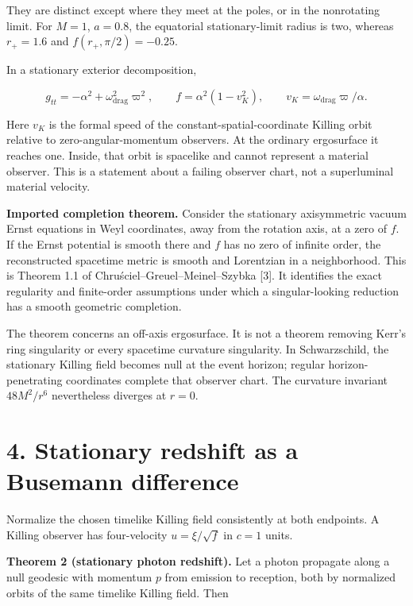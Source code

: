 \documentclass[
  11pt,
  a4paper,
]{article}
\begin{document}
They are distinct except where they meet at the poles, or in the nonrotating limit. For \(M=1\), \(a=0.8\), the equatorial stationary-limit radius is two, whereas \(r_+=1.6\) and \(f(r_+,\pi/2)=-0.25\).

In a stationary exterior decomposition,

\[
g_{tt}=-\alpha^2+\omega_{\mathrm{drag}}^2\varpi^2,
\qquad f=\alpha^2(1-v_K^2),
\qquad v_K=\omega_{\mathrm{drag}}\varpi/\alpha.
\]

Here \(v_K\) is the formal speed of the constant-spatial-coordinate Killing orbit relative to zero-angular-momentum observers. At the ordinary ergosurface it reaches one. Inside, that orbit is spacelike and cannot represent a material observer. This is a statement about a failing observer chart, not a superluminal material velocity.

\textbf{Imported completion theorem.} Consider the stationary axisymmetric vacuum Ernst equations in Weyl coordinates, away from the rotation axis, at a zero of \(f\). If the Ernst potential is smooth there and \(f\) has no zero of infinite order, the reconstructed spacetime metric is smooth and Lorentzian in a neighborhood. This is Theorem 1.1 of Chruściel--Greuel--Meinel--Szybka {[}3{]}. It identifies the exact regularity and finite-order assumptions under which a singular-looking reduction has a smooth geometric completion.

The theorem concerns an off-axis ergosurface. It is not a theorem removing Kerr's ring singularity or every spacetime curvature singularity. In Schwarzschild, the stationary Killing field becomes null at the event horizon; regular horizon-penetrating coordinates complete that observer chart. The curvature invariant \(48M^2/r^6\) nevertheless diverges at \(r=0\).

\section{4. Stationary redshift as a Busemann difference}\label{stationary-redshift-as-a-busemann-difference}

Normalize the chosen timelike Killing field consistently at both endpoints. A Killing observer has four-velocity \(u=\xi/\sqrt f\) in \(c=1\) units.

\textbf{Theorem 2 (stationary photon redshift).} Let a photon propagate along a null geodesic with momentum \(p\) from emission to reception, both by normalized orbits of the same timelike Killing field. Then
\end{document}
